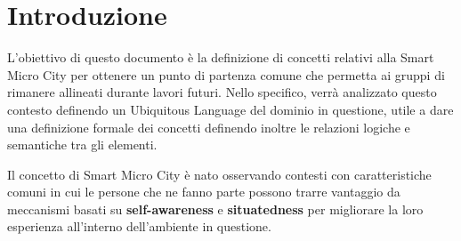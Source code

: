 \section*{Introduzione}\label{sec:introduction}
L'obiettivo di questo documento è la definizione di concetti relativi alla Smart Micro City per ottenere un punto di partenza comune che permetta ai gruppi di rimanere allineati durante lavori futuri.
Nello specifico, verrà analizzato questo contesto definendo un Ubiquitous Language del dominio in questione, utile a dare una definizione formale dei concetti definendo inoltre le relazioni logiche e semantiche tra gli elementi.

Il concetto di Smart Micro City è nato osservando contesti con caratteristiche comuni in cui le persone che ne fanno parte possono trarre vantaggio da meccanismi basati su \textbf{self-awareness} e \textbf{situatedness} per migliorare la loro esperienza all'interno dell'ambiente in questione.
